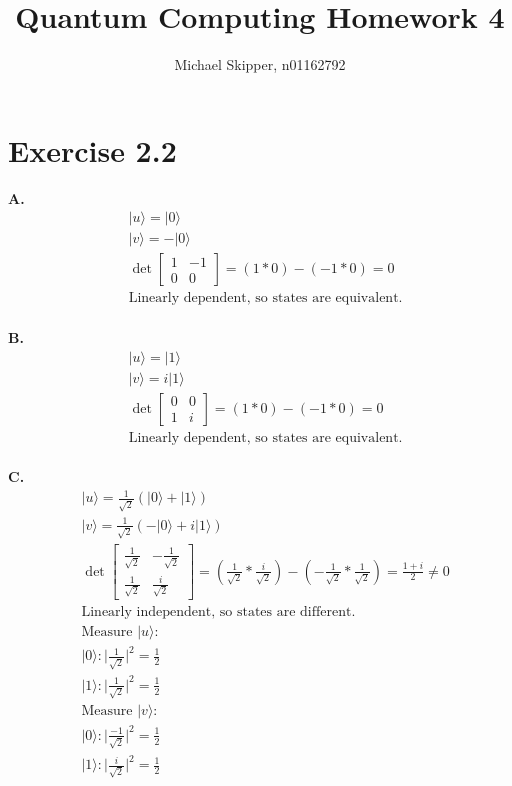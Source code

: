\documentclass{article}
\title{Quantum Computing Homework 4}
\author{Michael Skipper, n01162792}
\date{}
\def\ket#1{|#1\rangle}
\begin{document}
\maketitle

\section{Exercise 2.2}
\textbf{A. }
\begin{align*}
    &\ket{u} = \ket{0} 
    \\
    &\ket{v} = -\ket{0}
    \\ 
    &\det{\begin{bmatrix}
    1 & -1 \\ 0 & 0
    \end{bmatrix}} = (1*0) - (-1*0) = 0 \\
    &\text{Linearly dependent, so states are equivalent.}
\end{align*} \\ 
\textbf{B. }
\begin{align*}
    &\ket{u} = \ket{1} 
    \\
    &\ket{v} = i\ket{1}
    \\ 
    &\det{\begin{bmatrix}
    0 & 0 \\ 1 & i
    \end{bmatrix}} = (1*0) - (-1*0) = 0 \\
    &\text{Linearly dependent, so states are equivalent.}
\end{align*} \\ 
\textbf{C. }
\begin{align*}
    &\ket{u} = \frac{1}{\sqrt{2}}(\ket{0} + \ket{1})
    \\
    &\ket{v} = \frac{1}{\sqrt{2}}(-\ket{0} + i\ket{1})
    \\ 
    &\det{\begin{bmatrix}
    \frac{1}{\sqrt{2}} & -\frac{1}{\sqrt{2}} \\ \frac{1}{\sqrt{2}} & \frac{i}{\sqrt{2}}
    \end{bmatrix}} = (\frac{1}{\sqrt{2}}*\frac{i}{\sqrt{2}}) - (-\frac{1}{\sqrt{2}}*\frac{1}{\sqrt{2}}) = \frac{1 + i}{2} \neq{0} \\
    &\text{Linearly independent, so states are different.} \\ 
    &\text{Measure }\ket{u}: \\ 
    &\ket{0}: |\frac{1}{\sqrt{2}}|^2 = \frac{1}{2} \\ 
    &\ket{1}: |\frac{1}{\sqrt{2}}|^2 = \frac{1}{2} \\ 
    &\text{Measure }\ket{v}: \\ 
    &\ket{0}: |\frac{-1}{\sqrt{2}}|^2 = \frac{1}{2} \\ 
    &\ket{1}: |\frac{i}{\sqrt{2}}|^2 = \frac{1}{2}
\end{align*} 
\end{document}
